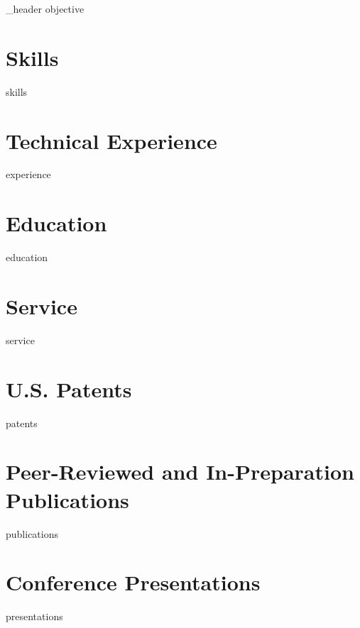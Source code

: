 \documentclass[letter,10pt]{article}
\author{Joelle Tori Maslak} %
\begin{document}
{_header}
{objective}

\raggedright

\section{Skills}
{skills}

\section{Technical Experience}
{experience}

\section{Education}
{education}

\section{Service}
{service}

\section{U.S. Patents}
{patents}

\section{Peer-Reviewed and In-Preparation Publications}
{publications}

\section{Conference Presentations}
{presentations}
\end{document}
